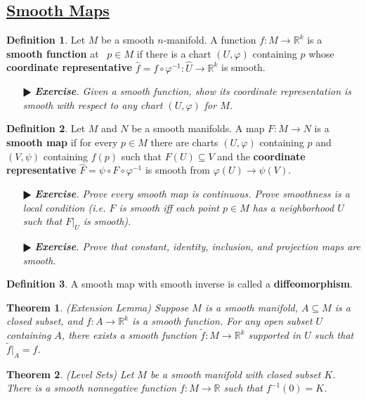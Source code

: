 \documentclass[11pt]{amsart}
\newtheorem*{theorem*}{Theorem}
\theoremstyle{definition}
\newtheorem*{definition*}{Definition}
\renewcommand\hat{\widehat}
\renewcommand\tilde{\widetilde}
\renewcommand\:{\colon}
\newcommand{\R}{\mathds{R}}
\newcommand{\1}{\mathds{1}}
\newcommand{\exc}[1]{\vspace{-2.5pt}\begin{itemize}[leftmargin=15pt]\item[$\RHD$] \textit{\textbf{Exercise}. #1}\end{itemize}}
\begin{document}
\subsection*{\underline{Smooth Maps}}

\begin{definition*}
	Let $M$ be a smooth $n$-manifold. A function $f\: M \to \R^k$ is a \textbf{smooth function} at \ $p \in M$ if there is a chart $(U, \varphi)$ containing $p$ whose \textbf{coordinate representative} $\hat f = f \circ \varphi^{-1}\: \hat U \to \R^k$ is smooth.
\end{definition*}

\exc{Given a smooth function, show its coordinate representation is smooth with respect to \textnormal{any} chart $(U, \varphi)$ for $M$.}

\begin{definition*}
	Let $M$ and $N$ be a smooth manifolds. A map $F\: M \to N$ is a \textbf{smooth map} if for every $p \in M$ there are charts $(U, \varphi)$ containing $p$ and $(V, \psi)$ containing $f(p)$ such that $F(U) \subseteq V$ and the \textbf{coordinate representative} $\hat F = \psi \circ F \circ \varphi^{-1}$ is smooth from $\varphi(U) \to \psi(V)$.
\end{definition*}

\exc{Prove every smooth map is continuous. Prove smoothness is a local condition (i.e. $F$ is smooth iff each point $p \in M$ has a neighborhood $U$ such that $F|_U$ is smooth).}
\exc{Prove that constant, identity, inclusion, and projection maps are smooth.}

\begin{definition*}
	A smooth map with smooth inverse is called a \textbf{diffeomorphism}.
\end{definition*}

\begin{theorem*}
	\textnormal{(Extension Lemma)} Suppose $M$ is a smooth manifold, $A \subseteq M$ is a closed subset, and $f\: A \to \R^k$ is a smooth function. For any open subset $U$ containing $A$, there exists a smooth function $\tilde f\: M \to \R^k$ supported in $U$ such that $\tilde f|_A = f$.
\end{theorem*}

\begin{theorem*}
	\textnormal{(Level Sets)} Let $M$ be a smooth manifold with closed subset $K$. There is a smooth nonnegative function $f\: M \to \R$ such that $f^{-1}(0) = K$.
\end{theorem*}
\vskip20pt
\end{document}
